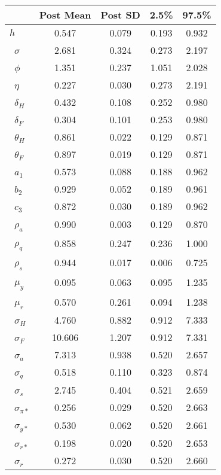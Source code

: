 \begin{tiny}\begin{tabular}{lcccc}
\hline
&\textbf{Post Mean}&\textbf{Post SD}&\textbf{2.5\%}&\textbf{97.5\%}\\\hline
\textbf{$ h             $}&0.547&0.079&0.193&0.932\\\
\textbf{$ \sigma        $}&2.681&0.324&0.273&2.197\\\
\textbf{$ \phi          $}&1.351&0.237&1.051&2.028\\\
\textbf{$ \eta          $}&0.227&0.030&0.273&2.191\\\
\textbf{$ \delta_{H}    $}&0.432&0.108&0.252&0.980\\\
\textbf{$ \delta_{F}    $}&0.304&0.101&0.253&0.980\\\
\textbf{$ \theta_{H}    $}&0.861&0.022&0.129&0.871\\\
\textbf{$ \theta_{F}    $}&0.897&0.019&0.129&0.871\\\
\textbf{$ a_{1}         $}&0.573&0.088&0.188&0.962\\\
\textbf{$ b_{2}         $}&0.929&0.052&0.189&0.961\\\
\textbf{$ c_{3}         $}&0.872&0.030&0.189&0.962\\\
\textbf{$ \rho_{a}      $}&0.990&0.003&0.129&0.870\\\
\textbf{$ \rho_{q}      $}&0.858&0.247&0.236&1.000\\\
\textbf{$ \rho_{s}      $}&0.944&0.017&0.006&0.725\\\
\textbf{$ \mu_{y}       $}&0.095&0.063&0.095&1.235\\\
\textbf{$ \mu_{r}       $}&0.570&0.261&0.094&1.238\\\
\textbf{$ \sigma_{H}    $}&4.760&0.882&0.912&7.333\\\
\textbf{$ \sigma_{F}    $}&10.606&1.207&0.912&7.331\\\
\textbf{$ \sigma_{a}    $}&7.313&0.938&0.520&2.657\\\
\textbf{$ \sigma_{q}    $}&0.518&0.110&0.323&0.874\\\
\textbf{$ \sigma_{s}    $}&2.745&0.404&0.521&2.659\\\
\textbf{$ \sigma_{\pi*} $}&0.256&0.029&0.520&2.663\\\
\textbf{$ \sigma_{y*}   $}&0.530&0.062&0.520&2.661\\\
\textbf{$ \sigma_{r*}   $}&0.198&0.020&0.520&2.653\\\
\textbf{$ \sigma_{r}    $}&0.272&0.030&0.520&2.660\\\hline
\end{tabular}
\end{tiny}